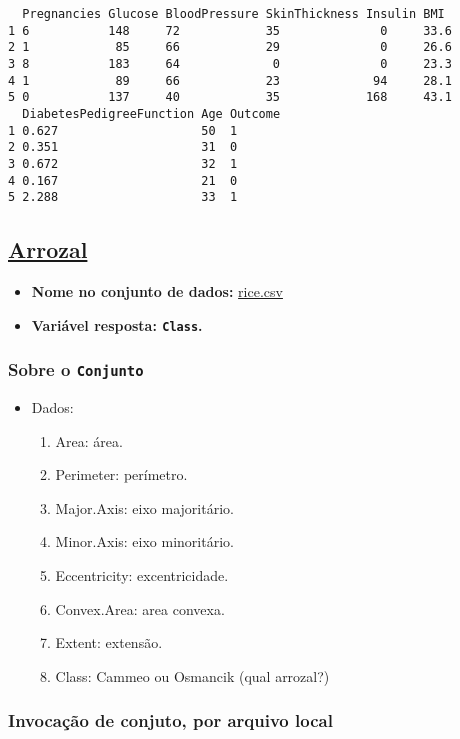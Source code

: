 \documentclass[12pt]{article}
\begin{document}
\begin{verbatim}
  Pregnancies Glucose BloodPressure SkinThickness Insulin BMI 
1 6           148     72            35              0     33.6
2 1            85     66            29              0     26.6
3 8           183     64             0              0     23.3
4 1            89     66            23             94     28.1
5 0           137     40            35            168     43.1
  DiabetesPedigreeFunction Age Outcome
1 0.627                    50  1      
2 0.351                    31  0      
3 0.672                    32  1      
4 0.167                    21  0      
5 2.288                    33  1      
\end{verbatim}
\clearpage

\subsection{\href{https://archive.ics.uci.edu/ml/datasets/Rice+\%28Cammeo+and+Osmancik\%29}{Arrozal}}
\label{sec:org59d8608}
\begin{itemize}
\item \textbf{Nome no conjunto de dados:}  \href{https://drive.google.com/file/d/1zFkHbui6Ro2N\_tNsgPSeajyl7g8XrdAc/view?usp=sharing}{rice.csv}
\item \textbf{Variável resposta:  \texttt{Class}.}
\end{itemize}
\subsubsection{Sobre o \texttt{Conjunto}}
\label{sec:orgf3a8a16}
\begin{itemize}
\item Dados:
\begin{enumerate}
\item Area: área.
\item Perimeter: perímetro.
\item Major.Axis: eixo majoritário.
\item Minor.Axis: eixo minoritário.
\item Eccentricity: excentricidade.
\item Convex.Area: area convexa.
\item Extent: extensão.
\item Class: Cammeo ou Osmancik (qual arrozal?)
\end{enumerate}
\end{itemize}
\subsubsection{Invocação de conjuto, por arquivo local}
\label{sec:orga5d35e9}
\end{document}
